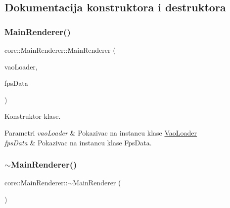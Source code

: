 \subsection{Dokumentacija konstruktora i destruktora}
\mbox{\label{classcore_1_1MainRenderer_abe5c50d41cd58c1c89f290ffffae78dc}} 
\subsubsection{\texorpdfstring{Main\+Renderer()}{MainRenderer()}}
{\footnotesize\ttfamily core\+::\+Main\+Renderer\+::\+Main\+Renderer (\begin{DoxyParamCaption}\item[{\hyperlink{classcore_1_1VaoLoader}{Vao\+Loader} $\ast$}]{vao\+Loader,  }\item[{\hyperlink{classutility_1_1FpsData}{Fps\+Data} $\ast$}]{fps\+Data }\end{DoxyParamCaption})}



Konstruktor klase. 


\begin{DoxyParams}{Parametri}
{\em vao\+Loader} & Pokazivac na instancu klase \hyperlink{classcore_1_1VaoLoader}{Vao\+Loader} \\
\hline
{\em fps\+Data} & Pokazivac na instancu klase Fps\+Data. \\
\hline
\end{DoxyParams}
\mbox{\label{classcore_1_1MainRenderer_a1e5f39d2178a7c5738efa9be9bd486da}} 
\subsubsection{\texorpdfstring{$\sim$\+Main\+Renderer()}{~MainRenderer()}}
{\footnotesize\ttfamily core\+::\+Main\+Renderer\+::$\sim$\+Main\+Renderer (\begin{DoxyParamCaption}{ }\end{DoxyParamCaption})}



